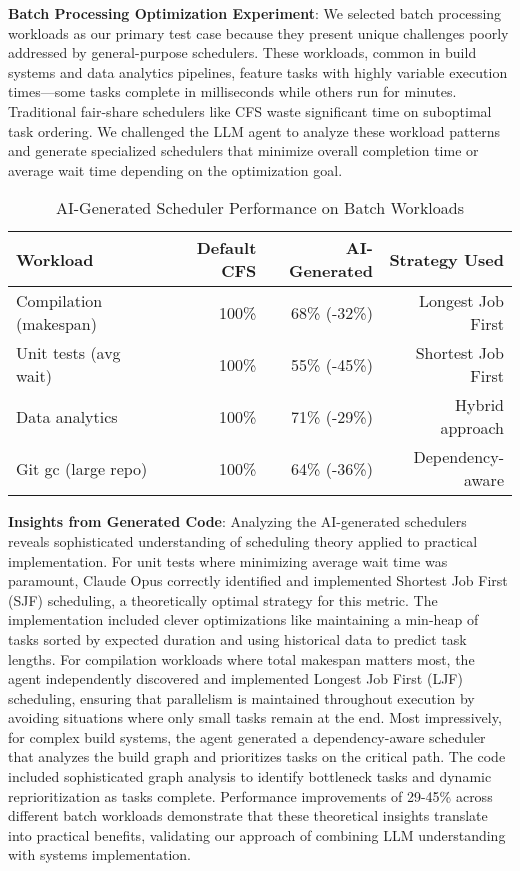\textbf{Batch Processing Optimization Experiment}: We selected batch processing workloads as our primary test case because they present unique challenges poorly addressed by general-purpose schedulers. These workloads, common in build systems and data analytics pipelines, feature tasks with highly variable execution times—some tasks complete in milliseconds while others run for minutes. Traditional fair-share schedulers like CFS waste significant time on suboptimal task ordering. We challenged the LLM agent to analyze these workload patterns and generate specialized schedulers that minimize overall completion time or average wait time depending on the optimization goal.

\begin{table}[h]
\caption{AI-Generated Scheduler Performance on Batch Workloads}
\label{tab:batch-results}
\begin{tabular}{lrrr}
\toprule
Workload & Default CFS & AI-Generated & Strategy Used \\
\midrule
Compilation (makespan) & 100\% & 68\% (-32\%) & Longest Job First \\
Unit tests (avg wait) & 100\% & 55\% (-45\%) & Shortest Job First \\
Data analytics & 100\% & 71\% (-29\%) & Hybrid approach \\
Git gc (large repo) & 100\% & 64\% (-36\%) & Dependency-aware \\
\bottomrule
\end{tabular}
\end{table}

\textbf{Insights from Generated Code}: Analyzing the AI-generated schedulers reveals sophisticated understanding of scheduling theory applied to practical implementation. For unit tests where minimizing average wait time was paramount, Claude Opus correctly identified and implemented Shortest Job First (SJF) scheduling, a theoretically optimal strategy for this metric. The implementation included clever optimizations like maintaining a min-heap of tasks sorted by expected duration and using historical data to predict task lengths. For compilation workloads where total makespan matters most, the agent independently discovered and implemented Longest Job First (LJF) scheduling, ensuring that parallelism is maintained throughout execution by avoiding situations where only small tasks remain at the end. Most impressively, for complex build systems, the agent generated a dependency-aware scheduler that analyzes the build graph and prioritizes tasks on the critical path. The code included sophisticated graph analysis to identify bottleneck tasks and dynamic reprioritization as tasks complete. Performance improvements of 29-45\% across different batch workloads demonstrate that these theoretical insights translate into practical benefits, validating our approach of combining LLM understanding with systems implementation.

